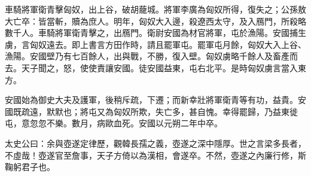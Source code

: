 \begin{pinyinscope}
車騎將軍衛青擊匈奴，出上谷，破胡蘢城。將軍李廣為匈奴所得，復失之；公孫敖大亡卒：皆當斬，贖為庶人。明年，匈奴大入邊，殺遼西太守，及入鴈門，所殺略數千人。車騎將軍衛青擊之，出鴈門。衛尉安國為材官將軍，屯於漁陽。安國捕生虜，言匈奴遠去。即上書言方田作時，請且罷軍屯。罷軍屯月餘，匈奴大入上谷、漁陽。安國壁乃有七百餘人，出與戰，不勝，復入壁。匈奴虜略千餘人及畜產而去。天子聞之，怒，使使責讓安國。徒安國益東，屯右北平。是時匈奴虜言當入東方。

安國始為御史大夫及護軍，後稍斥疏，下遷；而新幸壯將軍衛青等有功，益貴。安國既疏遠，默默也；將屯又為匈奴所欺，失亡多，甚自愧。幸得罷歸，乃益東徙屯，意忽忽不樂。數月，病歐血死。安國以元朔二年中卒。

太史公曰：余與壺遂定律歷，觀韓長孺之義，壺遂之深中隱厚。世之言梁多長者，不虛哉！壺遂官至詹事，天子方倚以為漢相，會遂卒。不然，壺遂之內廉行修，斯鞠躬君子也。


\end{pinyinscope}